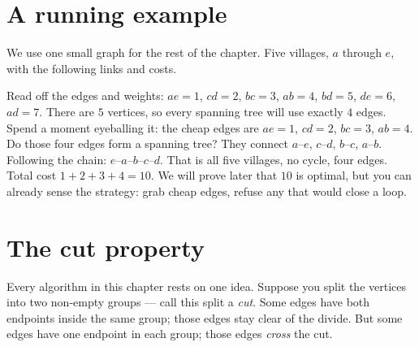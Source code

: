 \section{A running example}

We use one small graph for the rest of the chapter.
Five villages, $a$ through $e$, with the following links and costs.

\begin{center}
\end{center}

Read off the edges and weights: $ae{=}1$, $cd{=}2$, $bc{=}3$, $ab{=}4$,
$bd{=}5$, $de{=}6$, $ad{=}7$. There are $5$ vertices, so every spanning tree
will use exactly $4$ edges. Spend a moment eyeballing it: the cheap edges are
$ae{=}1$, $cd{=}2$, $bc{=}3$, $ab{=}4$. Do those four edges form a spanning
tree? They connect $a$--$e$, $c$--$d$, $b$--$c$, $a$--$b$. Following the chain:
$e$--$a$--$b$--$c$--$d$. That is all five villages, no cycle, four edges. Total
cost $1+2+3+4 = 10$. We will prove later that $10$ is optimal, but you can already
sense the strategy: grab cheap edges, refuse any that would close a loop.

\section{The cut property}

Every algorithm in this chapter rests on one idea. Suppose you split the
vertices into two non-empty groups --- call this split a \emph{cut}. Some edges
have both endpoints inside the same group; those edges stay clear of the divide.
But some edges have one endpoint in each group; those edges \emph{cross} the cut.


